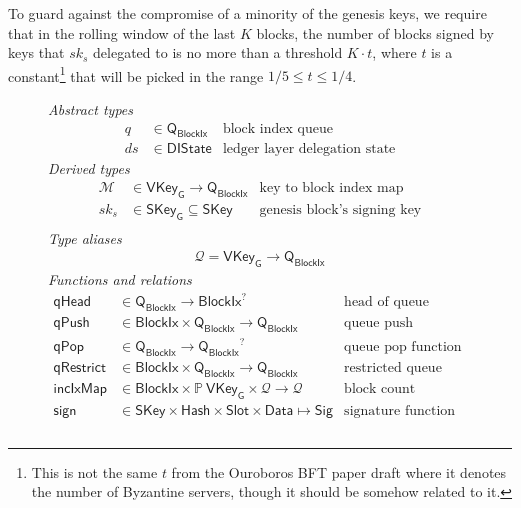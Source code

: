 \documentclass[11pt,a4paper]{article}
\newcommand{\powerset}[1]{\mathbb{P}~#1}
\newcommand{\var}[1]{\mathit{#1}}
\newcommand{\fun}[1]{\mathsf{#1}}
\newcommand{\type}[1]{\mathsf{#1}}
\newcommand{\Hash}{\type{Hash}}  %
\newcommand{\Slot}{\type{Slot}}
\newcommand{\BlockIx}{\type{BlockIx}}
\newcommand{\Queue}{\type{Q}}
\newcommand{\SKey}{\type{SKey}}
\newcommand{\SKeyGen}{\type{SKey_G}}
\newcommand{\VKeyGen}{\type{VKey_G}}
\newcommand{\Sig}{\type{Sig}}
\newcommand{\Data}{\type{Data}}
\newcommand{\DelegState}{\type{DIState}}
\newcommand{\signname}{sign}
\newcommand{\signmapname}{\mathcal{M}}
\newcommand{\incixmapname}{incIxMap}
\newcommand{\qrestrname}{qRestrict}
\newcommand{\qpopname}{qPop}
\newcommand{\qheadname}{qHead}
\newcommand{\qpushname}{qPush}
\newcommand{\totalf}{\to}
\newcommand{\partialf}{\mapsto}
\newcommand{\mapqueue}{\mathcal{Q}}
\begin{document}
To guard against the compromise of a minority of the genesis keys,
we require that in the rolling window of the last $K$ blocks, the number of
blocks signed by keys that $sk_s$ delegated to is no more than a threshold $K
\cdot t$, where $t$ is a constant\footnote{This is not the same $t$ from the
  Ouroboros BFT paper draft where it denotes the number of Byzantine servers,
  though it should be somehow related to it.} that will be picked in the range
$1/5 \leq t \leq 1/4$.

\begin{figure}[ht]
  \emph{Abstract types}
  \begin{align*}
    q  & \in \Queue_\BlockIx  & \text{block index queue}\\
    \var{ds} & \in \DelegState & \text{ledger layer delegation state}
  \end{align*}
  \emph{Derived types}
  \begin{align*}
    \signmapname & \in \VKeyGen \totalf \Queue_\BlockIx & \text{key to block index map}\\
    \var{sk_s} & \in \SKeyGen \subseteq \SKey & \text{genesis block's signing key}\\
  \end{align*}
  \emph{Type aliases}
  \begin{align*}
    \mapqueue = \VKeyGen \totalf \Queue_\BlockIx
  \end{align*}
  \emph{Functions and relations}
  \begin{align*}
    \fun{\qheadname} & \in \Queue_\BlockIx \totalf \BlockIx^? & \text{head of queue function} \\
    \fun{\qpushname} & \in \BlockIx \times \Queue_\BlockIx \totalf \Queue_\BlockIx
      & \text{queue push function} \\
    \fun{\qpopname} & \in \Queue_\BlockIx \totalf {\Queue_\BlockIx}^?
      & \text{queue pop function} \\
    \fun{\qrestrname} & \in \BlockIx \times \Queue_\BlockIx \totalf \Queue_\BlockIx
      & \text{restricted queue pop function} \\
    \fun{\incixmapname} & \in \BlockIx \times \powerset \VKeyGen \times \mapqueue \totalf \mapqueue
      & \text{block count increment function}\\
    \fun{\signname} & \in \SKey \times \Hash \times \Slot \times \Data \partialf \Sig
      & \text{signature function}\\
  \end{align*}
  \begin{align}

\end{align}
\end{figure}
\end{document}
